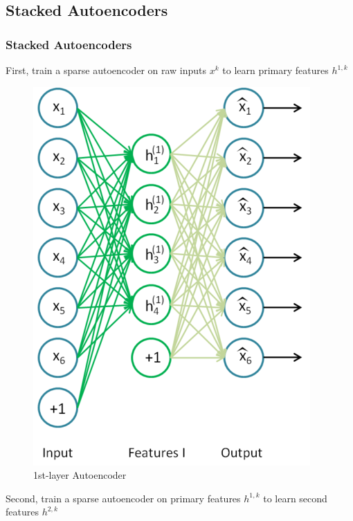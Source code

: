 \documentclass{beamer}
\begin{document}
\begin{CJK*}{UTF8}{gbsn}
\section{Stacked Autoencoders}
\begin{frame}[allowframebreaks]\frametitle{Stacked Autoencoders}
First, train a sparse autoencoder on raw inputs $x^k$ to learn primary features $h^{1,k}$
\begin{figure}
\centering
\includegraphics[scale=0.55]{images/Stacked_SparseAE_Features1}
\caption{1st-layer Autoencoder}
\end{figure}
Second, train a sparse autoencoder on primary features $h^{1,k}$ to learn second features $h^{2,k}$
\begin{figure}
\centering

\end{figure}
\end{frame}
\end{CJK*}
\end{document}
